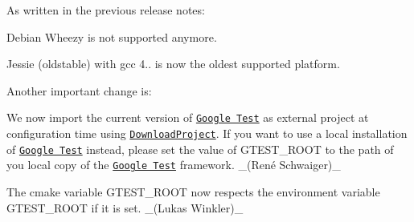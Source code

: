 As written in the previous release notes\+:


\begin{DoxyItemize}
\item Debian Wheezy is not supported anymore.
\item Jessie (oldstable) with gcc 4.. is now the oldest supported platform.
\end{DoxyItemize}

Another important change is\+:


\begin{DoxyItemize}
\item We now import the current version of \href{https://github.com/google/googletest}{\tt Google Test} as external project at configuration time using \href{https://github.com/Crascit/DownloadProject}{\tt Download\+Project}. If you want to use a local installation of \href{https://github.com/google/googletest}{\tt Google Test} instead, please set the value of {\ttfamily G\+T\+E\+S\+T\+\_\+\+R\+O\+OT} to the path of you local copy of the \href{https://github.com/google/googletest}{\tt Google Test} framework. \+\_\+(René Schwaiger)\+\_\+
\item The cmake variable {\ttfamily G\+T\+E\+S\+T\+\_\+\+R\+O\+OT} now respects the environment variable {\ttfamily G\+T\+E\+S\+T\+\_\+\+R\+O\+OT} if it is set. \+\_\+(\+Lukas Winkler)\+\_\+
\end{DoxyItemize}


